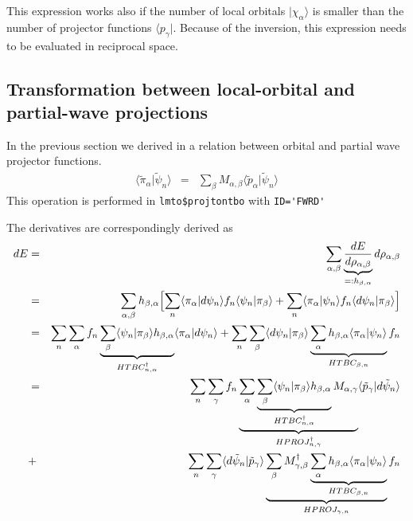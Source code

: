 \documentclass[11pt,a4paper]{report}
\begin{document}
This expression works also if the number of local orbitals
$|\chi_\alpha\rangle$ is smaller than the number of projector
functions $\langle{p}_\gamma|$. Because of the inversion, this
expression needs to be evaluated in reciprocal space.

\subsection{Transformation between local-orbital and partial-wave projections}
In the previous section we derived in  a relation
between orbital and partial wave projector functions.
\begin{eqnarray}
\langle\tilde{\pi}_\alpha|\tilde{\psi}_n\rangle
&=&\sum_\beta M_{\alpha,\beta}\langle\tilde{p}_\alpha|\tilde{\psi}_n\rangle
\end{eqnarray}
This operation is performed in \verb|lmto$projtontbo| with \verb|ID='FWRD'|




The derivatives are correspondingly derived as 
\begin{eqnarray}
dE&=&\sum_{\alpha,\beta}\underbrace{\frac{dE}{d\rho_{\alpha,\beta}}}
_{=:h_{\beta,\alpha}}d\rho_{\alpha,\beta}
\nonumber\\
&=&\sum_{\alpha,\beta}h_{\beta,\alpha}
\Bigl[
\sum_n\langle\pi_\alpha|d\psi_n\rangle f_n\langle\psi_n|\pi_\beta\rangle
+\sum_n\langle\pi_\alpha|\psi_n\rangle f_n\langle{d}\psi_n|\pi_\beta\rangle
\Bigr]
\nonumber\\
&=&\sum_n\sum_{\alpha}
f_n
\underbrace{\sum_{\beta}
\langle\psi_n|\pi_\beta\rangle h_{\beta,\alpha}}_{HTBC^\dagger_{n,\alpha}}
\langle\pi_\alpha|d\psi_n\rangle 
+
\sum_n\sum_{\beta}
\langle{d}\psi_n|\pi_\beta\rangle 
\underbrace{\sum_{\alpha}h_{\beta,\alpha} \langle\pi_\alpha|\psi_n\rangle}_{HTBC_{\beta,n}} f_n
\nonumber\\
&=&\sum_n\sum_{\gamma}
f_n
\underbrace{\sum_{\alpha}
\underbrace{\sum_{\beta}
\langle\psi_n|\pi_\beta\rangle h_{\beta,\alpha}}_{HTBC^\dagger_{n,\alpha}}
M_{\alpha,\gamma}}_{HPROJ^\dagger_{n,\gamma}}
\langle\tilde{p}_\gamma|d\tilde{\psi}_n\rangle 
\nonumber\\
&+&
\sum_n\sum_{\gamma}
\langle{d}\tilde{\psi}_n|\tilde{p}_\gamma\rangle 
\underbrace{
\sum_{\beta}M^\dagger_{\gamma,\beta}
\underbrace{\sum_{\alpha}h_{\beta,\alpha} \langle\pi_\alpha|\psi_n\rangle}_{HTBC_{\beta,n}}}_{HPROJ_{\gamma,n}} f_n
\end{eqnarray}
\end{document}
